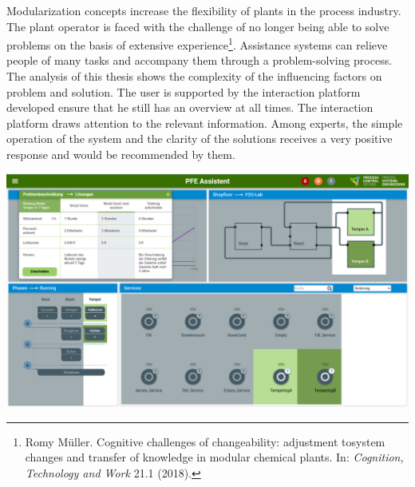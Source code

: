 Modularization concepts increase the flexibility of plants in the process industry. The plant operator is faced with the challenge of no longer being able to solve problems on the basis of extensive experience\footnote{Romy Müller. \glqq Cognitive challenges of changeability: adjustment tosystem changes and transfer of knowledge in modular chemical plants\grqq. In: \textit{Cognition, Technology and Work} 21.1 (2018).}. Assistance systems can relieve people of many tasks and accompany them through a problem-solving process. The analysis of this thesis shows the complexity of the influencing factors on problem and solution. The user is supported by the interaction platform developed ensure that he still has an overview at all times. The interaction platform draws attention to the relevant information. Among experts, the simple operation of the system and the clarity of the solutions receives a very positive response and would be recommended by them.

\vspace{10pt}
\begin{center}
\includegraphics[scale=0.25]{DA_files/Bilder/Konzept/Skizze-Loesungen-PFE.png}
\end{center}
\vspace{6pt}